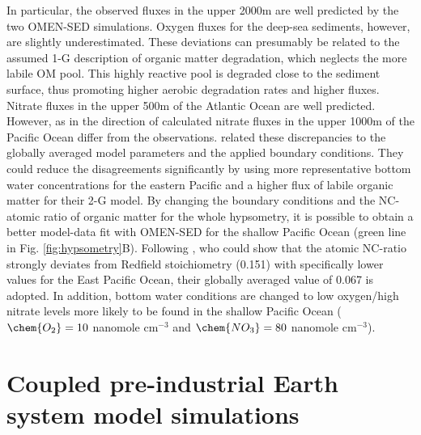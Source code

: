\documentclass[gmd, manuscript]{copernicus}
\begin{document}
In particular, the observed  fluxes in the upper 2000m are well predicted by the two OMEN-SED simulations. Oxygen fluxes for the deep-sea sediments, however, are slightly underestimated. 
These deviations can presumably be related to the assumed 1-G description of organic matter degradation, which neglects the more labile OM pool. This highly reactive pool is degraded close to the sediment surface, 
thus promoting higher aerobic degradation rates and higher  fluxes.  
Nitrate fluxes in the upper 500m of the Atlantic Ocean are well predicted. However, as in \citet{middelburg_denitrification_1996} the direction of calculated nitrate fluxes in the upper 1000m of the Pacific Ocean differ from the observations. 
\citet{middelburg_denitrification_1996} related these discrepancies to the globally averaged model parameters and the applied boundary conditions. They could reduce the disagreements significantly by using more representative 
bottom water concentrations for the eastern Pacific and a higher flux of labile organic matter for their 2-G model. By changing the boundary conditions and the NC-atomic ratio of organic matter for the whole hypsometry, it is possible 
to obtain a better model-data fit with OMEN-SED for the shallow Pacific Ocean (green line in Fig. \ref{fig:hypsometry}B). 
Following \citet{bohlen_simple_2012}, who could show that the atomic NC-ratio strongly deviates from Redfield stoichiometry (0.151) with specifically lower values for the East Pacific Ocean, their globally averaged value of 0.067 is adopted. 
In addition, bottom water conditions are changed to low oxygen/high nitrate levels more likely to be found in the shallow Pacific Ocean ($\chem{O_2} = 10$ nanomole cm$^{-3}$ and $\chem{NO_3} = 80$ nanomole cm$^{-3}$). 


\section{Coupled pre-industrial Earth system model simulations}\label{sec:ESM_coupling}
\end{document}
